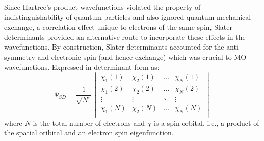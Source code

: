             Since Hartree's product wavefunctions violated the property of indistinguishability of quantum particles and also ignored quantum mechanical exchange, a correlation effect unique to electrons of the same spin, Slater determinants provided an alternative route to incorporate these effects in the wavefunctions. By construction, Slater determinants accounted for the anti-symmetry and electronic spin (and hence exchange) which was crucial to MO wavefunctions. Expressed in determinant form as:
            \begin{equation}\label{eq:Slater determinant}
                \Psi_{SD} = \frac{1}{\sqrt{N!}}
                \begin{vmatrix}
                    \chi_1 (1) & \chi_2 (1) & \ldots & \chi_N (1)\\
                    \chi_1 (2) & \chi_2 (2) & \ldots & \chi_N (2)\\
                    \vdots & \vdots & \ddots & \vdots\\
                    \chi_1 (N) & \chi_2 (N) & \ldots & \chi_N (N)\\
                \end{vmatrix}
            \end{equation}
            where $N$ is the total number of electrons and $\chi$ is a spin-orbital, i.e., a product of the spatial oribital and an electron spin eigenfunction.

